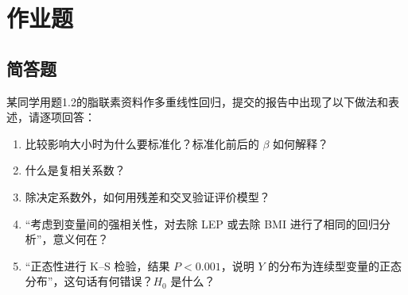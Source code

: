 
\label{chapter:1}

\par\addvspace{8pt}\noindent\begin{minipage}{\linewidth}

\section{作业题}

\subsection{简答题}


某同学用题1.2的脂联素资料作多重线性回归，提交的报告中出现了以下做法和表述，请逐项回答：

\begin{enumerate}
\def\labelenumi{\arabic{enumi}.}
\tightlist
\item
  比较影响大小时为什么要标准化？标准化前后的 \(\beta\) 如何解释？
\item
  什么是复相关系数？
\item
  除决定系数外，如何用残差和交叉验证评价模型？
\item
  ``考虑到变量间的强相关性，对去除 LEP 或去除 BMI 进行了相同的回归分析''，意义何在？
\item
  ``正态性进行 K--S 检验，结果 \(P<0.001\)，说明 \(Y\) 的分布为连续型变量的正态分布''，这句话有何错误？\(H_0\) 是什么？
\end{enumerate}



\end{minipage}\par\vspace{5pt}

